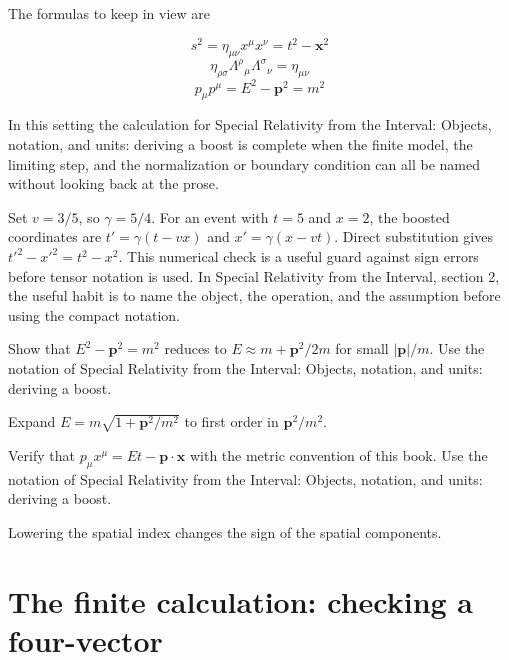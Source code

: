 The formulas to keep in view are

\[
  s^2=\eta_{\mu\nu}x^\mu x^\nu=t^2-\bm x^2
\]
\[
  \eta_{\rho\sigma}\Lambda^\rho{}_\mu\Lambda^\sigma{}_\nu=\eta_{\mu\nu}
\]
\[
  p_\mu p^\mu=E^2-\bm p^2=m^2
\]

In this setting the calculation for Special Relativity from the Interval: Objects, notation, and units: deriving a boost is complete when the finite model, the limiting step, and the normalization or boundary condition can all be named without looking back at the prose.




\begin{example}
Set \(v=3/5\), so \(\gamma=5/4\).  For an event with \(t=5\) and \(x=2\), the boosted coordinates are \(t'=\gamma(t-vx)\) and \(x'=\gamma(x-vt)\).  Direct substitution gives \(t'^2-x'^2=t^2-x^2\).  This numerical check is a useful guard against sign errors before tensor notation is used.  In Special Relativity from the Interval, section 2, the useful habit is to name the object, the operation, and the assumption before using the compact notation.
\end{example}



\begin{exercise}
Show that \(E^2-\bm p^2=m^2\) reduces to \(E\approx m+\bm p^2/2m\) for small \(|\bm p|/m\).  Use the notation of Special Relativity from the Interval: Objects, notation, and units: deriving a boost.
\begin{answer}
Expand \(E=m\sqrt{1+\bm p^2/m^2}\) to first order in \(\bm p^2/m^2\).
\end{answer}
\end{exercise}

\begin{exercise}
Verify that \(p_\mu x^\mu=Et-\bm p\cdot\bm x\) with the metric convention of this book.  Use the notation of Special Relativity from the Interval: Objects, notation, and units: deriving a boost.
\begin{answer}
Lowering the spatial index changes the sign of the spatial components.
\end{answer}
\end{exercise}



\section{The finite calculation: checking a four-vector}

